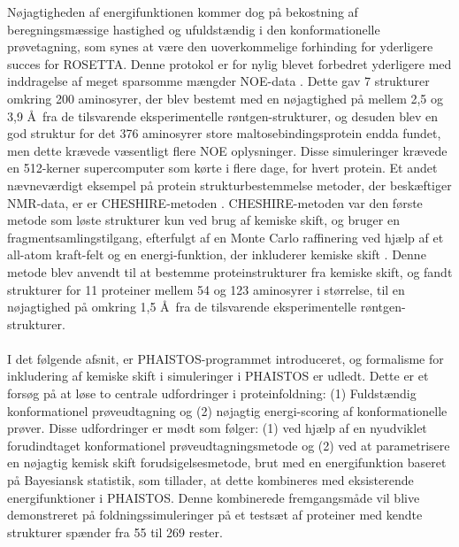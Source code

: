 Nøjagtigheden af energifunktionen kommer dog på bekostning af beregningsmæssige hastighed og ufuldstændig i den konformationelle prøvetagning, som synes at være den uoverkommelige forhinding for yderligere succes for ROSETTA.
Denne protokol er for nylig blevet forbedret yderligere med inddragelse af meget sparsomme mængder NOE-data \cite{LangePNAS2012}.
Dette gav 7 strukturer omkring 200 aminosyrer, der blev bestemt med en nøjagtighed på mellem 2,5 og 3,9 \AA~fra de tilsvarende eksperimentelle røntgen-strukturer, og desuden blev en god struktur for det 376 aminosyrer store maltosebindingsprotein endda fundet, men dette krævede væsentligt flere NOE oplysninger. Disse simuleringer krævede en 512-kerner supercomputer som kørte i flere dage, for hvert protein.
Et andet nævneværdigt eksempel på protein strukturbestemmelse metoder, der beskæftiger NMR-data, er er CHESHIRE-metoden \cite{cheshire}. CHESHIRE-metoden var den første metode som løste strukturer kun ved brug af kemiske skift, og bruger en fragmentsamlingstilgang, efterfulgt af en Monte Carlo raffinering ved hjælp af et all-atom kraft-felt og en energi-funktion, der inkluderer kemiske skift . Denne metode blev anvendt til at bestemme proteinstrukturer fra kemiske skift, og fandt strukturer for 11 proteiner mellem 54 og 123 aminosyrer i størrelse, til en nøjagtighed på omkring 1,5 \AA~fra de tilsvarende eksperimentelle røntgen-strukturer.
\\\\I det følgende afsnit, er PHAISTOS-programmet introduceret, og formalisme for inkludering af kemiske skift i simuleringer i PHAISTOS er udledt. Dette er et forsøg på at løse
to centrale udfordringer i proteinfoldning: (1) Fuldstændig konformationel prøveudtagning og (2) nøjagtig energi-scoring af konformationelle prøver.
Disse udfordringer er mødt som følger: (1) ved hjælp af en nyudviklet forudindtaget konformationel prøveudtagningsmetode og (2) ved at parametrisere en nøjagtig kemisk skift forudsigelsesmetode, brut med en energifunktion baseret på Bayesiansk statistik, som tillader, at dette kombineres med eksisterende energifunktioner i PHAISTOS.
Denne kombinerede fremgangsmåde vil blive demonstreret på foldningssimuleringer på et testsæt af proteiner med kendte strukturer spænder fra 55 til 269 rester.
